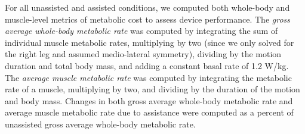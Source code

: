\documentclass[10pt,letterpaper]{article}
\begin{document}
For all unassisted and assisted conditions, we computed both whole-body and muscle-level metrics of metabolic cost to assess device performance. The \textit{gross average whole-body metabolic rate} was computed by integrating the sum of individual muscle metabolic rates, multiplying by two (since we only solved for the right leg and assumed medio-lateral symmetry), dividing by the motion duration and total body mass, and adding a constant basal rate of 1.2 W/kg. The \textit{average muscle metabolic rate} was computed by integrating the metabolic rate of a muscle, multiplying by two, and dividing by the duration of the motion and body mass. Changes in both gross average whole-body metabolic rate and average muscle metabolic rate due to assistance were computed as a percent of unassisted gross average whole-body metabolic rate.
\end{document}
